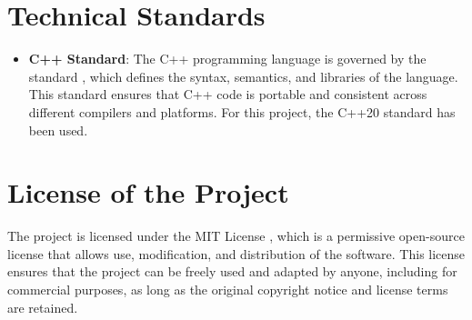 \section{Technical Standards}
\begin{itemize}
    \item \textbf{C++ Standard}: The C++ programming language is governed by the standard \cite{cpp-standard}, which defines the syntax, semantics, and libraries of the language. This standard ensures that C++ code is portable and consistent across different compilers and platforms. For this project, the C++20 standard \cite{cpp20-standard} has been used.
\end{itemize}

\section{License of the Project}
The project is licensed under the MIT License \cite{mit-license}, which is a permissive open-source license that allows use, modification, and distribution of the software. This license ensures that the project can be freely used and adapted by anyone, including for commercial purposes, as long as the original copyright notice and license terms are retained.

